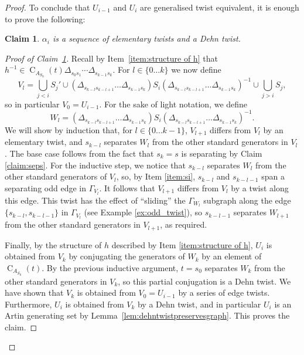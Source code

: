\documentclass[svgnames]{amsart}
\theoremstyle{plain}
\newtheorem{claim}[thm]{Claim}
\theoremstyle{definition}
\newenvironment{claimproof}{\renewcommand{\qedsymbol}{$\blacksquare$}\begin{proof}}{\end{proof}}
\newcommand{\centre}[2]{\operatorname{C}_{#1}(#2)}
\begin{document}
\begin{proof}
    To conclude that $U_{i-1}$ and $U_{i}$ are generalised twist equivalent, it is enough to prove the following:
    
    
    \begin{claim}\label{claim:twist_by_steps}
        $\alpha_i$ is a sequence of elementary twists and a Dehn twist.
    \end{claim}
    
    \begin{claimproof}[Proof of Claim~\ref{claim:twist_by_steps}]
    Recall by Item~\eqref{item:structure of h} that $h^{-1}\in\centre{A_{S_0}}{t}\Delta_{s_0s_1}\cdots\Delta_{s_{k-1}s_k}$. For $l \in \{0 \dots k\}$ we now define 
    $$V_l = \bigcup_{j<i}S_j'\cup (\Delta_{s_{k-l}s_{k-l+1}} \dots \Delta_{s_{k-1}s_k}) S_i (\Delta_{s_{k-l}s_{k-l+1}} \dots \Delta_{s_{k-1}s_k})^{-1} \cup \bigcup_{j > i}S_j,$$
    so in particular $V_0 = U_{i-1}$. For the sake of light notation, we define 
    $$W_l = (\Delta_{s_{k-l}s_{k-l+1}} \dots \Delta_{s_{k-1}s_k}) S_i (\Delta_{s_{k-l}s_{k-l+1}} \dots \Delta_{s_{k-1}s_k})^{-1}.$$
    We will show by induction that, for $l \in \{0 \dots k-1\}$, $V_{l+1}$ differs from $V_l$ by an elementary twist, and $s_{k-l}$ separates $W_l$ from the other standard generators in $V_l$. The base case follows from the fact that $s_k = s$ is separating by Claim \ref{claim:seps}. For the inductive step, we notice that $s_{k-l}$ separates $W_l$ from the other standard generators of $V_l$, so,  by Item \eqref{item:si}, $s_{k-l}$ and $s_{k-l-1}$ span a separating odd edge in $\Gamma_{V_l}$. It follows that $V_{l+1}$ differs from $V_l$ by a twist along this edge. This twist has the effect of ``sliding'' the $\Gamma_{W_l}$ subgraph along the edge $\{s_{k-l}, s_{k-l-1}\}$ in $\Gamma_{V_l}$ (see Example \ref{ex:odd_twist}), so $s_{k-l-1}$ separates $W_{l+1}$ from the other standard generators in $V_{l+1}$, as required.

    Finally, by the structure of $h$ described by Item \eqref{item:structure of h}, $U_i$ is obtained from $V_k$ by conjugating the generators of $W_k$ by an element of $\centre {A_{S_0}}{t}$. By the previous inductive argument, $t = s_0$ separates $W_k$ from the other standard generators in $V_k$, so this partial conjugation is a Dehn twist. We have shown that $V_k$ is obtained from $V_0 = U_{i-1}$ by a series of edge twists. Furthermore, $U_i$ is obtained from $V_k$ by a Dehn twist, and in particular $U_i$ is an Artin generating set by Lemma~\ref{lem:dehntwistpreservesgraph}. This proves the claim. 
    \end{claimproof}
    





\end{proof}
\end{document}
